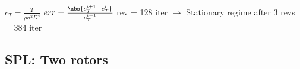 \begin{frame}{\subsecname}
\begin{figure} [H]
{  }
\end{figure} 
\begin{center}
\vspace{-0.4cm}
 $c_T = \frac{T}{\rho n^2 D^4}$ \hspace{4cm} $err = \frac{\abs{c_T^{i+1}- c_T^{i}}}{c_T^{i+1}}$
 \newline
  rev = 128 iter $\xrightarrow{}$ Stationary regime after 3 revs = 384 iter
\end{center}

\end{frame}

\subsection{SPL: Two rotors }
\begin{frame}{\subsecname}


\end{frame}
